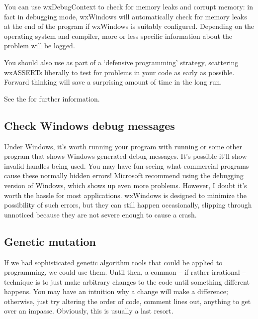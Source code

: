 You can use wxDebugContext to check for
memory leaks and corrupt memory: in fact in debugging mode, wxWindows will
automatically check for memory leaks at the end of the program if wxWindows is suitably
configured. Depending on the operating system and compiler, more or less
specific information about the problem will be logged.

You should also use  as part of a `defensive programming' strategy,
scattering wxASSERTs liberally to test for problems in your code as early as possible. Forward thinking
will save a surprising amount of time in the long run.

See the  for further information.

\subsection{Check Windows debug messages}

Under Windows, it's worth running your program with 
 running or
some other program that shows Windows-generated debug messages. It's
possible it'll show invalid handles being used. You may have fun seeing
what commercial programs cause these normally hidden errors! Microsoft
recommend using the debugging version of Windows, which shows up even
more problems. However, I doubt it's worth the hassle for most
applications. wxWindows is designed to minimize the possibility of such
errors, but they can still happen occasionally, slipping through unnoticed
because they are not severe enough to cause a crash.

\subsection{Genetic mutation}

If we had sophisticated genetic algorithm tools that could be applied
to programming, we could use them. Until then, a common -- if rather irrational --
technique is to just make arbitrary changes to the code until something
different happens. You may have an intuition why a change will make a difference;
otherwise, just try altering the order of code, comment lines out, anything
to get over an impasse. Obviously, this is usually a last resort.

